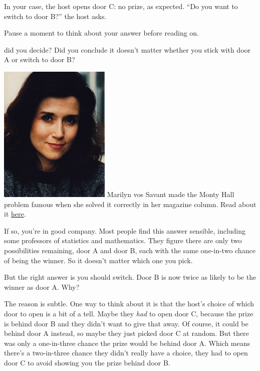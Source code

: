 \documentclass[justified]{tufte-book}
\theoremstyle{definition}
\theoremstyle{definition}
\theoremstyle{definition}
\theoremstyle{definition}
\theoremstyle{remark}
\begin{document}
In your case, the host opens door C: no prize, as expected. ``Do you want to switch to door B?'' the host asks.

Pause a moment to think about your answer before reading on.

 did you decide? Did you conclude it doesn't matter whether you stick with door A or switch to door B?

\begin{marginfigure}
\includegraphics{img/marilyn_vos_savant.png} Marilyn vos Savant made the
Monty Hall problem famous when she solved it correctly in her magazine
column. Read about it
\href{https://www.nytimes.com/1991/07/21/us/behind-monty-hall-s-doors-puzzle-debate-and-answer.html}{here}.
\end{marginfigure}

If so, you're in good company. Most people find this answer sensible, including some professors of statistics and mathematics. They figure there are only two possibilities remaining, door A and door B, each with the same one-in-two chance of being the winner. So it doesn't matter which one you pick.

But the right answer is you should switch. Door B is now twice as likely to be the winner as door A. Why?

The reason is subtle. One way to think about it is that the host's choice of which door to open is a bit of a tell. Maybe they \emph{had} to open door C, because the prize is behind door B and they didn't want to give that away. Of course, it could be behind door A instead, so maybe they just picked door C at random. But there was only a one-in-three chance the prize would be behind door A. Which means there's a two-in-three chance they didn't really have a choice, they had to open door C to avoid showing you the prize behind door B.
\end{document}
